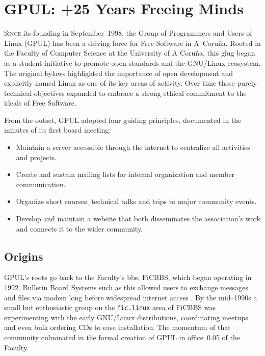 %

\chapter{GPUL: +25 Years Freeing Minds}

\lettrine{S}{ince} its founding in September~1998, the Group of Programmers
and Users of Linux (GPUL) \cite{gpul-web} has been a driving force for Free Software in A~Coru\~na.
Rooted in the Faculty of Computer Science at the University of
A Coru\~na, this \gls{glug} began as a student initiative to promote open
standards and the GNU/Linux ecosystem. The original bylaws highlighted
the importance of open development and explicitly named Linux as one of
its key areas of activity. Over time those purely technical objectives
expanded to embrace a strong ethical commitment to the ideals of Free
Software.

From the outset, GPUL adopted four guiding principles, documented in the
minutes of its first board meeting:
\begin{itemize}
  \item Maintain a server accessible through the internet to centralize
    all activities and projects.
  \item Create and sustain mailing lists for internal organization and
    member communication.
  \item Organize short courses, technical talks and trips to major
    community events.
  \item Develop and maintain a website that both disseminates the
    association's work and connects it to the wider community.
\end{itemize}

\section{Origins}

GPUL's roots go back to the Faculty's \gls{bbs}, FiCBBS, which began
operating in 1992. Bulletin Board Systems such as this allowed users to
exchange messages and files via modem long before widespread internet
access \cite{Fido93}. By the mid--1990s a small but enthusiastic group on the
\texttt{fic.linux} area of FiCBBS was experimenting with the early
GNU/Linux distributions, coordinating meetups and even bulk ordering CDs
to ease installation. The momentum of that community culminated in the
formal creation of GPUL in office~0.05 of the Faculty.

